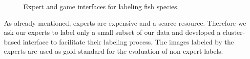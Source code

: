 \begin{figure}[t!]
\centering
{}
\caption{Expert and game interfaces for labeling fish species.}
\end{figure}

As already mentioned, experts are expensive and a scarce resource.
Therefore we ask our experts to label only a small subset of our data
and developed a cluster-based interface to facilitate their labeling
process. The images labeled by the experts are used as gold standard
for the evaluation of non-expert labels.


